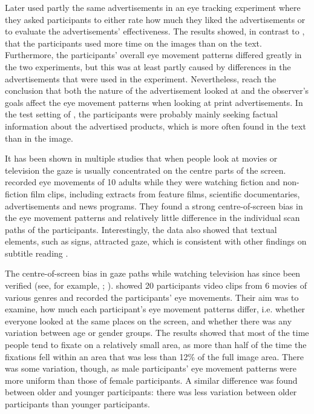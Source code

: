 \documentclass[output=paper]{langsci/langscibook}
\begin{document}
Later \citet{rayner2008} used partly the same advertisements in an eye tracking experiment where they asked participants to either rate how much they liked the advertisements or to evaluate the advertisements' effectiveness. The results showed, in contrast to \citet{rayner2001}, that the participants used more time on the images than on the text. Furthermore, the participants' overall eye movement patterns differed greatly in the two experiments, but this was at least partly caused by differences in the advertisements that were used in the experiment. Nevertheless, \citet{rayner2008} reach the conclusion that both the nature of the advertisement looked at and the observer's goals affect the eye movement patterns when looking at print advertisements. In the test setting of \citet{rayner2008}, the participants were probably mainly seeking factual information about the advertised products, which is more often found in the text than in the image. 

It has been shown in multiple studies that when people look at movies or television the gaze is usually concentrated on the centre parts of the screen. \citet{tosi1997} recorded eye movements of 10 adults while they were watching fiction and non-fiction film clips, including extracts from feature films, scientific documentaries, advertisements and news programs. They found a strong centre-of-screen bias in the eye movement patterns and relatively little difference in the individual scan paths of the participants. Interestingly, the data also showed that textual elements, such as signs, attracted gaze, which is consistent with other findings on subtitle reading \citep{dydewalle1987, dydewalle1991, dydewalle1992}. 

The centre-of-screen bias in gaze paths while watching television has since been verified (see, for example, \citet{goldstein2007}; \citet{brasel2008}). \citet{goldstein2007} showed 20 participants video clips from 6 movies of various genres and recorded the participants' eye movements. Their aim was to examine, how much each participant's eye movement patterns differ, i.e. whether everyone looked at the same places on the screen, and whether there was any variation between age or gender groups. The results showed that most of the time people tend to fixate on a relatively small area, as more than half of the time the fixations fell within an area that was less than 12\% of the full image area. There was some variation, though, as male participants' eye movement patterns were more uniform than those of female participants. A similar difference was found between older and younger participants: there was less variation between older participants than younger participants. 
\end{document}
